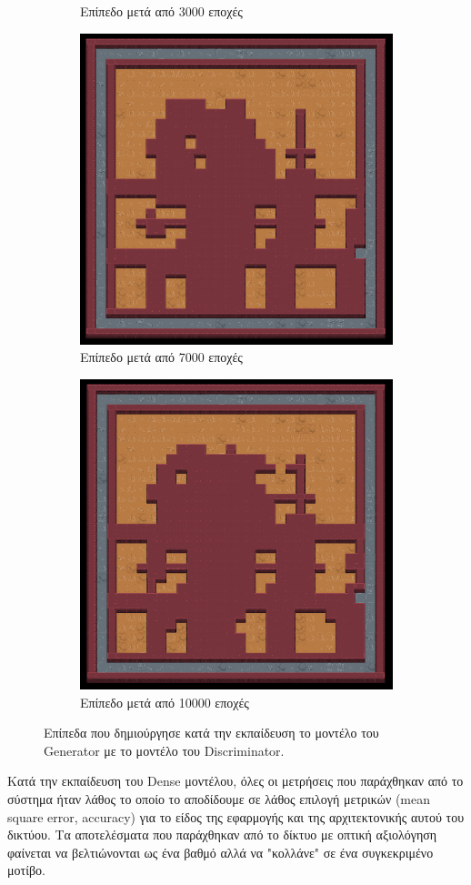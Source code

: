 \begin{figure}[H]
\begin{subfigure}{.5\textwidth}
  \caption{Επίπεδο μετά από 3000 εποχές}
  \label{fig:sfig2}
\end{subfigure}
\begin{subfigure}{.5\textwidth}
  \centering
  \includegraphics[width=.8\linewidth]{../images/result_images/dense-gan/generator_7000.png}
  \caption{Επίπεδο μετά από 7000 εποχές}
  \label{fig:sfig2}
\end{subfigure}
\begin{subfigure}{.5\textwidth}
  \centering
  \includegraphics[width=.8\linewidth]{../images/result_images/dense-gan/generator_10000.png}
  \caption{Επίπεδο μετά από 10000 εποχές}
  \label{fig:sfig2}
\end{subfigure}
\caption{Επίπεδα που δημιούργησε κατά την εκπαίδευση το μοντέλο του Generator με το μοντέλο του Discriminator.}
\label{fig:fig}
\end{figure}

\par
Κατά την εκπαίδευση του Dense μοντέλου, όλες οι μετρήσεις που παράχθηκαν από το σύστημα ήταν λάθος το οποίο το αποδίδουμε σε λάθος επιλογή μετρικών (mean square error, accuracy) για το είδος της εφαρμογής και της αρχιτεκτονικής αυτού του δικτύου. Τα αποτελέσματα που παράχθηκαν από το δίκτυο με οπτική αξιολόγηση φαίνεται να βελτιώνονται ως ένα βαθμό αλλά να "κολλάνε" σε ένα συγκεκριμένο μοτίβο.
